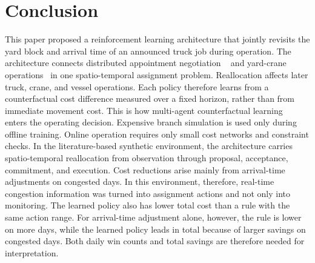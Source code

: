 \section{Conclusion}
\label{sec:concl}

This paper proposed a reinforcement learning architecture that jointly
revisits the yard block and arrival time of an announced truck job during
operation. The architecture connects distributed appointment negotiation
~\cite{ref6} and yard-crane operations~\cite{ref7,ref8} in one
spatio-temporal assignment problem. Reallocation affects later truck,
crane, and vessel operations. Each policy therefore learns from a
counterfactual cost difference measured over a fixed horizon, rather
than from immediate movement cost. This is how multi-agent
counterfactual learning~\cite{ref10,ref11} enters the operating
decision. Expensive branch simulation is used only during offline
training. Online operation requires only small cost networks and
constraint checks.
In the literature-based synthetic environment, the architecture carries
spatio-temporal reallocation from observation through proposal,
acceptance, commitment, and execution. Cost reductions arise mainly from
arrival-time adjustments on congested days. In this environment, therefore,
real-time congestion information was turned into assignment actions and
not only into monitoring. The learned policy also has lower total
cost than a rule with the same action range. For arrival-time adjustment
alone, however, the rule is lower on more days, while the learned policy
leads in total because of larger savings on congested days. Both daily
win counts and total savings are therefore needed for interpretation.

